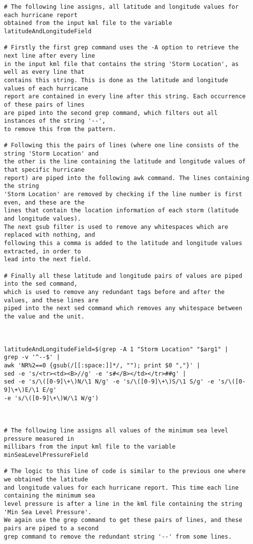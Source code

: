 \documentclass[]{article} %
\begin{document}
\begin{verbatim}
# The following line assigns, all latitude and longitude values for each hurricane report 
obtained from the input kml file to the variable latitudeAndLongitudeField

# Firstly the first grep command uses the -A option to retrieve the next line after every line 
in the input kml file that contains the string 'Storm Location', as well as every line that 
contains this string. This is done as the latitude and longitude values of each hurricane 
report are contained in every line after this string. Each occurrence of these pairs of lines 
are piped into the second grep command, which filters out all instances of the string '--', 
to remove this from the pattern. 

# Following this the pairs of lines (where one line consists of the string 'Storm Location' and 
the other is the line containing the latitude and longitude values of that specific hurricane 
report) are piped into the following awk command. The lines containing the string 
'Storm Location' are removed by checking if the line number is first even, and these are the 
lines that contain the location information of each storm (latitude and longitude values). 
The next gsub filter is used to remove any whitespaces which are replaced with nothing, and 
following this a comma is added to the latitude and longitude values extracted, in order to 
lead into the next field.

# Finally all these latitude and longitude pairs of values are piped into the sed command, 
which is used to remove any redundant tags before and after the values, and these lines are 
piped into the next sed command which removes any whitespace between the value and the unit.



latitudeAndLongitudeField=$(grep -A 1 "Storm Location" "$arg1" | 
grep -v '^--$' | 
awk 'NR%2==0 {gsub(/[[:space:]]*/, ""); print $0 ","}' | 
sed -e 's/<tr><td><B>//g' -e 's#</B></td></tr>##g' | 
sed -e 's/\([0-9]\+\)N/\1 N/g' -e 's/\([0-9]\+\)S/\1 S/g' -e 's/\([0-9]\+\)E/\1 E/g' 
-e 's/\([0-9]\+\)W/\1 W/g')



# The following line assigns all values of the minimum sea level pressure measured in 
millibars from the input kml file to the variable minSeaLevelPressureField

# The logic to this line of code is similar to the previous one where we obtained the latitude 
and longitude values for each hurricane report. This time each line containing the minimum sea 
level pressure is after a line in the kml file containing the string 'Min Sea Level Pressure'. 
We again use the grep command to get these pairs of lines, and these pairs are piped to a second 
grep command to remove the redundant string '--' from some lines.


\end{verbatim}
\end{document}
